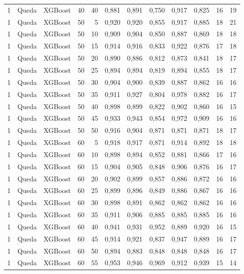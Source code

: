 \begin{longtable}{@{}rllrrrrrrrrr@{}}
1 & Queda & XGBoost & 40 & 40 & 0,881 & 0,891 & 0,750 & 0,917 & 0,825 & 16 & 19 \\
1 & Queda & XGBoost & 50 & 5 & 0,920 & 0,920 & 0,855 & 0,917 & 0,885 & 18 & 21 \\
1 & Queda & XGBoost & 50 & 10 & 0,909 & 0,904 & 0,850 & 0,887 & 0,869 & 18 & 18 \\
1 & Queda & XGBoost & 50 & 15 & 0,914 & 0,916 & 0,833 & 0,922 & 0,876 & 17 & 18 \\
1 & Queda & XGBoost & 50 & 20 & 0,890 & 0,886 & 0,812 & 0,873 & 0,841 & 18 & 17 \\
1 & Queda & XGBoost & 50 & 25 & 0,894 & 0,894 & 0,819 & 0,894 & 0,855 & 18 & 17 \\
1 & Queda & XGBoost & 50 & 30 & 0,904 & 0,900 & 0,839 & 0,887 & 0,862 & 16 & 16 \\
1 & Queda & XGBoost & 50 & 35 & 0,911 & 0,927 & 0,804 & 0,978 & 0,882 & 16 & 17 \\
1 & Queda & XGBoost & 50 & 40 & 0,898 & 0,899 & 0,822 & 0,902 & 0,860 & 16 & 15 \\
1 & Queda & XGBoost & 50 & 45 & 0,933 & 0,943 & 0,854 & 0,972 & 0,909 & 16 & 16 \\
1 & Queda & XGBoost & 50 & 50 & 0,916 & 0,904 & 0,871 & 0,871 & 0,871 & 18 & 17 \\
1 & Queda & XGBoost & 60 & 5 & 0,918 & 0,917 & 0,871 & 0,914 & 0,892 & 18 & 18 \\
1 & Queda & XGBoost & 60 & 10 & 0,898 & 0,894 & 0,852 & 0,881 & 0,866 & 17 & 16 \\
1 & Queda & XGBoost & 60 & 15 & 0,904 & 0,905 & 0,848 & 0,906 & 0,876 & 16 & 17 \\
1 & Queda & XGBoost & 60 & 20 & 0,902 & 0,899 & 0,857 & 0,886 & 0,872 & 16 & 16 \\
1 & Queda & XGBoost & 60 & 25 & 0,899 & 0,896 & 0,849 & 0,886 & 0,867 & 16 & 16 \\
1 & Queda & XGBoost & 60 & 30 & 0,898 & 0,891 & 0,862 & 0,862 & 0,862 & 16 & 16 \\
1 & Queda & XGBoost & 60 & 35 & 0,911 & 0,906 & 0,885 & 0,885 & 0,885 & 16 & 16 \\
1 & Queda & XGBoost & 60 & 40 & 0,941 & 0,931 & 0,952 & 0,889 & 0,920 & 16 & 15 \\
1 & Queda & XGBoost & 60 & 45 & 0,914 & 0,921 & 0,837 & 0,947 & 0,889 & 16 & 17 \\
1 & Queda & XGBoost & 60 & 50 & 0,894 & 0,883 & 0,848 & 0,848 & 0,848 & 16 & 17 \\
1 & Queda & XGBoost & 60 & 55 & 0,953 & 0,946 & 0,969 & 0,912 & 0,939 & 15 & 14 \\

\end{longtable}
